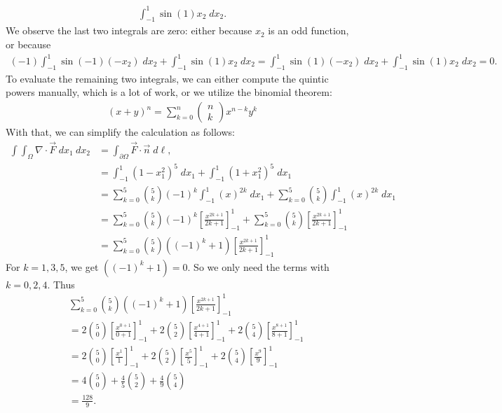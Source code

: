 \documentclass[11pt]{article}
\begin{document}
\begin{solution}
\begin{align*}
        \int_{-1}^1 \sin(1)x_2\;dx_2
        .
    \end{align*}
    We observe the last two integrals are zero: either because $x_2$ is an odd function, or because 
    \begin{align*}
        (-1)\int_{-1}^1 \sin(-1)(-x_2)\;dx_2
        +
        \int_{-1}^1 \sin(1)x_2\;dx_2
        =
        \int_{-1}^1 \sin(1) (-x_2)\;dx_2
        +
        \int_{-1}^1 \sin(1)  x_2  \;dx_2
        =
        0
        .
    \end{align*}
    To evaluate the remaining two integrals,
    we can either compute the quintic powers manually, which is a lot of work, or we utilize the binomial theorem:
    \begin{gather*}
        (x+y)^n=\sum_{k=0}^n\left(\begin{array}{l}
        n \\
        k
        \end{array}\right) x^{n-k} y^k
    \end{gather*}
    With that, we can simplify the calculation as follows: 
    \begin{align*}
        \int \int_{\Omega} \nabla \cdot \vec{F} \;d x_1 \:d x_2 
        &=
        \int_{\partial \Omega}\vec{F}\cdot\vec{n} \;d\ell,
        \\&=
        \int_{-1}^1 (1-x_1^2)^5 \;dx_1 + \int_{-1}^1 (1+x_1^2)^ 5 \;dx_1
        \\&=
        \sum_{k = 0}^5 \binom{5}{k} (-1)^{k} \int_{-1}^1 (x)^{2k} \;dx_1 + \sum_{k = 0}^5 \binom{5}{k}\int_{-1}^1 (x)^{2k} \;dx_1
        \\&=
        \sum_{k = 0}^5 \binom{5}{k} (-1)^{k} \left[\frac{x^{2k+1}}{2k+1}\right]_{-1}^1 + \sum_{k = 0}^5 \binom{5}{k} \left[\frac{x^{2k+1}}{2k+1}\right]_{-1}^1
        \\&=
        \sum_{k = 0}^5 \binom{5}{k} \left( (-1)^{k} + 1 \right) 
        \left[\frac{x^{2k+1}}{2k+1}\right]_{-1}^1
    \end{align*}
    For $k = 1, 3, 5$, we get $\left( (-1)^{k} + 1 \right) = 0$. 
    So we only need the terms with $k = 0, 2, 4$.
    Thus
    \begin{align*}
        &
        \sum_{k = 0}^5 \binom{5}{k} \left( (-1)^{k} + 1 \right) 
        \left[\frac{x^{2k+1}}{2k+1}\right]_{-1}^1
        \\&=
        2
        \binom{5}{0}
        \left[\frac{x^{0+1}}{0+1}\right]_{-1}^1
        +
        2
        \binom{5}{2}
        \left[\frac{x^{4+1}}{4+1}\right]_{-1}^1
        +
        2
        \binom{5}{4}
        \left[\frac{x^{8+1}}{8+1}\right]_{-1}^1
        \\&=
        2
        \binom{5}{0}
        \left[\frac{x^{1}}{1}\right]_{-1}^1
        +
        2
        \binom{5}{2}
        \left[\frac{x^{5}}{5}\right]_{-1}^1
        +
        2
        \binom{5}{4}
        \left[\frac{x^{9}}{9}\right]_{-1}^1
        \\&=
        4
        \binom{5}{0}
        +
        \frac 4 5
        \binom{5}{2}
        +
        \frac 4 9
        \binom{5}{4}
        \\&=
        \frac{128}{9}
        .
    \end{align*}
\end{solution}
\end{document}
